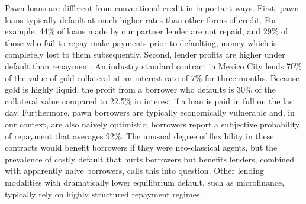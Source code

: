 \documentclass[12pt, a4paper, colorinlistoftodos]{article}
\begin{document}
Pawn loans are different from conventional credit in important ways. First, pawn loans typically default at much higher rates than other forms of credit. For example, 44\% of loans made by our partner lender are not repaid, and 29\% of those who fail to repay make payments prior to defaulting, money which is completely lost to them subsequently. Second, lender profits are higher under default than repayment. An industry standard contract in Mexico City lends 70\% of the value of gold collateral at an interest rate of 7\% for three months. Because gold is highly liquid, the profit from a borrower who defaults is 30\% of the collateral value compared to 22.5\% in interest if a loan is paid in full on the last day.   Furthermore, pawn borrowers are typically economically vulnerable and, in our context, are also naively optimistic; borrowers report a subjective probability of repayment that averages 92\%. The unusual degree of flexibility in these contracts would benefit borrowers if they were neo-classical agents, but the prevalence of costly default that hurts borrowers but benefits lenders, combined with apparently naive borrowers, calls this into question. Other lending modalities with dramatically lower equilibrium default, such as microfinance, typically rely on highly structured repayment regimes.


\end{document}
